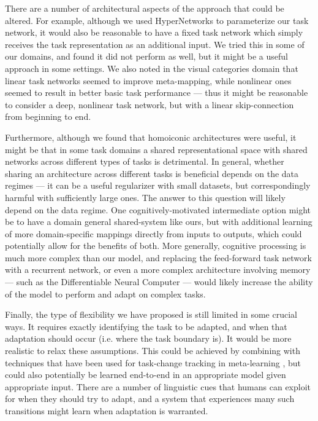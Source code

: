 There are a number of architectural aspects of the approach that could be altered. For example, although we used HyperNetworks to parameterize our task network, it would also be reasonable to have a fixed task network which simply receives the task representation as an additional input. We tried this in some of our domains, and found it did not perform as well, but it might be a useful approach in some settings. We also noted in the visual categories domain that linear task networks seemed to improve meta-mapping, while nonlinear ones seemed to result in better basic task performance --- thus it might be reasonable to consider a deep, nonlinear task network, but with a linear skip-connection from beginning to end. \par 

Furthermore, although we found that homoiconic architectures were useful, it might be that in some task domains a shared representational space with shared networks across different types of tasks is detrimental. In general, whether sharing an architecture across different tasks is beneficial depends on the data regimes --- it can be a useful regularizer with small datasets, but correspondingly harmful with sufficiently large ones. The answer to this question will likely depend on the data regime. One cognitively-motivated intermediate option might be to have a domain general shared-system like ours, but with additional learning of more domain-specific mappings directly from inputs to outputs, which could potentially allow for the benefits of both. More generally, cognitive processing is much more complex than our model, and replacing the feed-forward task network with a recurrent network, or even a more complex architecture involving memory --- such as the Differentiable Neural Computer \citep{Graves2016} --- would likely increase the ability of the model to perform and adapt on complex tasks.\par 

Finally, the type of flexibility we have proposed is still limited in some crucial ways. It requires exactly identifying the task to be adapted, and when that adaptation should occur (i.e. where the task boundary is). It would be more realistic to relax these assumptions. This could be achieved by combining with techniques that have been used for task-change tracking in meta-learning \citep[e.g.][]{Nagabandi2019}, but could also potentially be learned end-to-end in an appropriate model given appropriate input. There are a number of linguistic cues that humans can exploit for when they should try to adapt, and a system that experiences many such transitions might learn when adaptation is warranted. \par 


